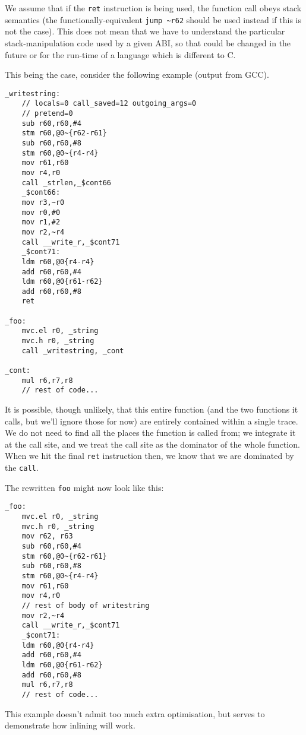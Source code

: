We assume that if the \texttt{ret} instruction is being used, the function call obeys stack semantics (the functionally-equivalent \texttt{jump \textasciitilde{}r62} should be used instead if this is not the case). This does not mean that we have to understand the particular stack-manipulation code used by a given ABI, so that could be changed in the future or for the run-time of a language which is different to C.

This being the case, consider the following example (output from GCC).

\begin{verbatim}
_writestring:
    // locals=0 call_saved=12 outgoing_args=0
    // pretend=0
    sub r60,r60,#4
    stm r60,@0~{r62-r61}
    sub r60,r60,#8
    stm r60,@0~{r4-r4}
    mov r61,r60
    mov r4,r0
    call _strlen,_$cont66
    _$cont66:
    mov r3,~r0
    mov r0,#0
    mov r1,#2
    mov r2,~r4
    call __write_r,_$cont71
    _$cont71:
    ldm r60,@0{r4-r4}
    add r60,r60,#4
    ldm r60,@0{r61-r62}
    add r60,r60,#8
    ret

_foo:
    mvc.el r0, _string
    mvc.h r0, _string
    call _writestring, _cont
    
_cont:
    mul r6,r7,r8
    // rest of code...
\end{verbatim}

It is possible, though unlikely, that this entire function (and the two functions it calls, but we'll ignore those for now) are entirely contained within a single trace. We do not need to find all the places the function is called from; we integrate it at the call site, and we treat the call site as the dominator of the whole function. When we hit the final \texttt{ret} instruction then, we know that we are dominated by the \texttt{call}.

The rewritten \texttt{foo} might now look like this:

\begin{verbatim}
_foo:
    mvc.el r0, _string
    mvc.h r0, _string
    mov r62, r63
    sub r60,r60,#4
    stm r60,@0~{r62-r61}
    sub r60,r60,#8
    stm r60,@0~{r4-r4}
    mov r61,r60
    mov r4,r0
    // rest of body of writestring
    mov r2,~r4
    call __write_r,_$cont71
    _$cont71:
    ldm r60,@0{r4-r4}
    add r60,r60,#4
    ldm r60,@0{r61-r62}
    add r60,r60,#8
    mul r6,r7,r8
    // rest of code...
\end{verbatim}

This example doesn't admit too much extra optimisation, but serves to demonstrate how inlining will work.

